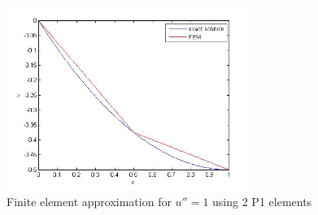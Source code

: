 \documentclass{article}
\begin{document}
\begin{figure}[H]
\begin{center}
\includegraphics[width=8cm]{ex19.jpg}    %
\caption{Finite element approximation for $u''=1$ using 2 P1 elements}
\end{center}
\end{figure}
\end{document}
